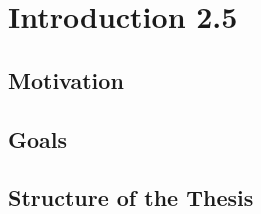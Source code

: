 \chapter{Introduction 2.5}
\label{cha:Introduction}

\section{Motivation}
\section{Goals}
\section{Structure of the Thesis}